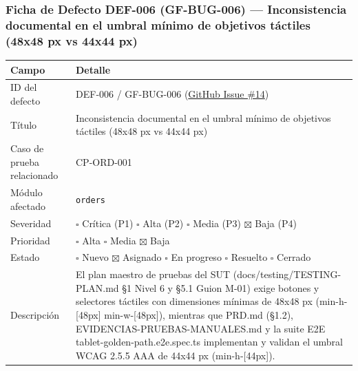 \documentclass[10pt,a4paper]{article}
\newcounter{none}
\begin{document}
\endgroup\medskip


\subsubsection{Ficha de Defecto DEF-006 (GF-BUG-006) --- Inconsistencia documental en el umbral mínimo de objetivos táctiles (48x48 px vs 44x44 px)}\label{ficha-de-defecto-def-006-gf-bug-006--inconsistencia-documental-en-el-umbral-muxednimo-de-objetivos-tuxe1ctiles-48x48-px-vs-44x44-px}

\begingroup\singlespacing\footnotesize\setlength{\parskip}{0pt}

{\def\LTcaptype{none} %
\begin{longtable}[]{@{}
  >{\raggedright\arraybackslash}p{}
  >{\raggedright\arraybackslash}p{}@{}}
\toprule\noalign{}
\begin{minipage}[b]{\linewidth}\raggedright
Campo
\end{minipage} & \begin{minipage}[b]{\linewidth}\raggedright
Detalle
\end{minipage} \\
\midrule\noalign{}
\endhead
\bottomrule\noalign{}
\endlastfoot
ID del defecto & DEF-006 / GF-BUG-006 (\href{https://github.com/H3llz07/GastroForge-Testing/issues/14}{GitHub Issue \#14}) \\
Título & Inconsistencia documental en el umbral mínimo de objetivos táctiles (48x48 px vs 44x44 px) \\
Caso de prueba relacionado & CP-ORD-001 \\
Módulo afectado & \texttt{orders} \\
Severidad & \ensuremath{\square} Crítica (P1) \ensuremath{\square} Alta (P2) \ensuremath{\square} Media (P3) \ensuremath{\boxtimes} Baja (P4) \\
Prioridad & \ensuremath{\square} Alta \ensuremath{\square} Media \ensuremath{\boxtimes} Baja \\
Estado & \ensuremath{\square} Nuevo \ensuremath{\boxtimes} Asignado \ensuremath{\square} En progreso \ensuremath{\square} Resuelto \ensuremath{\square} Cerrado \\
Descripción & El plan maestro de pruebas del SUT (docs/testing/TESTING-PLAN.md §1 Nivel 6 y §5.1 Guion M-01) exige botones y selectores táctiles con dimensiones mínimas de 48x48 px (min-h-{[}48px{]} min-w-{[}48px{]}), mientras que PRD.md (§1.2), EVIDENCIAS-PRUEBAS-MANUALES.md y la suite E2E tablet-golden-path.e2e.spec.ts implementan y validan el umbral WCAG 2.5.5 AAA de 44x44 px (min-h-{[}44px{]}). \\

\end{longtable}}
\end{document}

